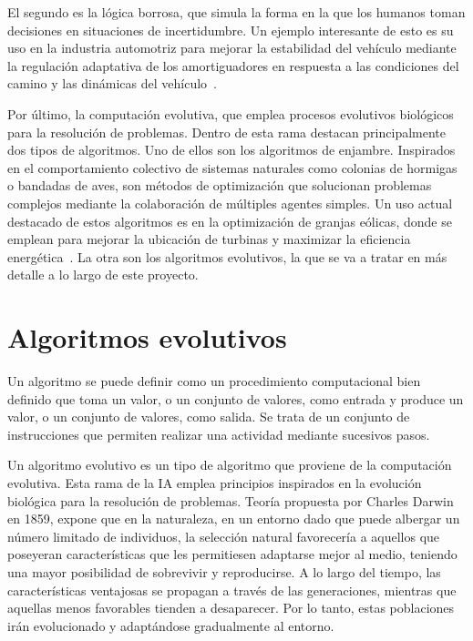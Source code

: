 El segundo es la lógica borrosa, que simula la forma en la que los humanos toman decisiones en situaciones de incertidumbre. Un ejemplo interesante de esto es su uso en la industria automotriz para mejorar la estabilidad del vehículo mediante la regulación adaptativa de los amortiguadores en respuesta a las condiciones del camino y las dinámicas del vehículo~\cite{ivanov2015}.

Por último, la computación evolutiva, que emplea procesos evolutivos biológicos para la resolución de problemas. Dentro de esta rama destacan principalmente dos tipos de algoritmos. Uno de ellos son los algoritmos de enjambre. Inspirados en el comportamiento colectivo de sistemas naturales como colonias de hormigas o bandadas de aves, son métodos de optimización que solucionan problemas complejos mediante la colaboración de múltiples agentes simples. Un uso actual destacado de estos algoritmos es en la optimización de granjas eólicas, donde se emplean para mejorar la ubicación de turbinas y maximizar la eficiencia energética~\cite{dong2023}. La otra son los algoritmos evolutivos, la que se va a tratar en más detalle a lo largo de este proyecto.

\section{Algoritmos evolutivos}

Un algoritmo se puede definir como un procedimiento computacional bien definido que toma un valor, o un conjunto de valores, como entrada y produce un valor, o un conjunto de valores, como salida. Se trata de un conjunto de instrucciones que permiten realizar una actividad mediante sucesivos pasos.

Un algoritmo evolutivo es un tipo de algoritmo que proviene de la computación evolutiva. Esta rama de la IA emplea principios inspirados en la evolución biológica para la resolución de problemas. Teoría propuesta por Charles Darwin en 1859, expone que en la naturaleza, en un entorno dado que puede albergar un número limitado de individuos, la selección natural favorecería a aquellos que poseyeran características que les permitiesen adaptarse mejor al medio, teniendo una mayor posibilidad de sobrevivir y reproducirse. A lo largo del tiempo, las características ventajosas se propagan a través de las generaciones, mientras que aquellas menos favorables tienden a desaparecer. Por lo tanto, estas poblaciones irán evolucionado y adaptándose gradualmente al entorno.

